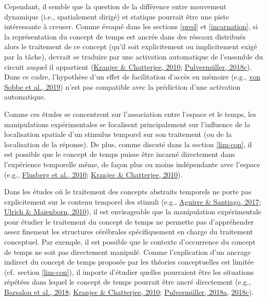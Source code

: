 \documentclass[
  a4paper,12pt,twoside,onecolumn,openright,final,oldfontcommands]{memoir}
\begin{document}
Cependant, il semble que la question de la différence entre mouvement dynamique (i.e., spatialement dirigé) et statique pourrait être une piste intéressante à creuser. Comme évoqué dans les sections \ref{pred} et \ref{incarnation}, si la représentation du concept de temps est ancrée dans des réseaux distribués alors le traitement de ce concept (qu'il soit explicitement ou implicitement exigé par la tâche), devrait se traduire par une activation automatique de l'ensemble du circuit auquel il appartient (\protect\hyperlink{ref-kranjec_are_2010}{Kranjec \& Chatterjee, 2010}; \protect\hyperlink{ref-pulvermuller_case_2018}{Pulvermüller, 2018c}). Dans ce cadre, l'hypothèse d'un effet de facilitation d'accès en mémoire (e.g., \protect\hyperlink{ref-von_sobbe_space-time_2019}{von Sobbe et al., 2019}) n'est pas compatible avec la prédiction d'une activation automatique.

Comme ces études se concentrent sur l'association entre l'espace et le temps, les manipulations expérimentales se focalisent principalement sur l'influence de la localisation spatiale d'un stimulus temporel sur son traitement (ou de la localisation de la réponse). De plus, comme discuté dans la section \ref{lim-con}, il est possible que le concept de temps puisse être incarné directement dans l'expérience temporelle même, de façon plus ou moins indépendante avec l'espace (e.g., \protect\hyperlink{ref-flusberg_connectionist_2010}{Flusberg et al., 2010}; \protect\hyperlink{ref-kranjec_are_2010}{Kranjec \& Chatterjee, 2010}).

Dans les études où le traitement des concepts abstraits temporels ne porte pas explicitement sur le contenu temporel des stimuli (e.g., \protect\hyperlink{ref-aguirre_potential_2017}{Aguirre \& Santiago, 2017}; \protect\hyperlink{ref-ulrich_leftright_2010}{Ulrich \& Maienborn, 2010}), il est envisageable que la manipulation expérimentale pour étudier le traitement du concept de temps ne permette pas d'appréhender assez finement les structures cérébrales spécifiquement en charge du traitement conceptuel. Par exemple, il est possible que le contexte d'occurrence du concept de temps ne soit pas directement manipulé. Comme l'explication d'un ancrage indirect du concept de temps proposée par les théories conceptuelles est limitée (cf.~section \ref{lim-con}), il importe d'étudier quelles pourraient être les situations répétées dans lequel le concept de temps pourrait être ancré directement (e.g., \protect\hyperlink{ref-barsalou_moving_2018}{Barsalou et al., 2018}; \protect\hyperlink{ref-kranjec_are_2010}{Kranjec \& Chatterjee, 2010}; \protect\hyperlink{ref-pulvermuller_neural_2018}{Pulvermüller, 2018a}, \protect\hyperlink{ref-pulvermuller_case_2018}{2018c}).
\end{document}
